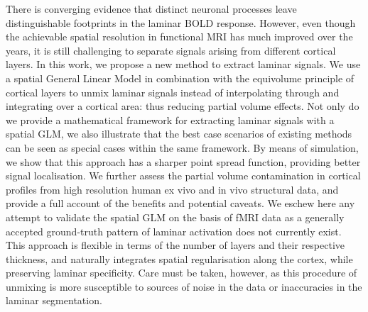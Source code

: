There is converging evidence that distinct neuronal processes leave distinguishable footprints in the laminar BOLD response. However, even though the achievable spatial resolution in functional MRI has much improved over the years, it is still challenging to separate signals arising from different cortical layers. In this work, we propose a new method to extract laminar signals.
We use a spatial General Linear Model in combination with the equivolume principle of cortical layers to unmix laminar signals instead of interpolating through and integrating over a cortical area: thus reducing partial volume effects. Not only do we provide a mathematical framework for extracting laminar signals with a spatial GLM, we also illustrate that the best case scenarios of existing methods can be seen as special cases within the same framework. 
By means of simulation, we show that this approach has a sharper point spread function, providing better signal localisation. 
We further assess the partial volume contamination in cortical profiles from high resolution human ex vivo and in vivo structural data, and provide a full account of the benefits and potential caveats. We eschew here any attempt to validate the spatial GLM on the basis of fMRI data as a generally accepted ground-truth pattern of laminar activation does not currently exist.
This approach is flexible in terms of the number of layers and their respective thickness, and naturally integrates spatial regularisation along the cortex, while preserving laminar specificity. Care must be taken, however, as this procedure of unmixing is more susceptible to sources of noise in the data or inaccuracies in the laminar segmentation.
